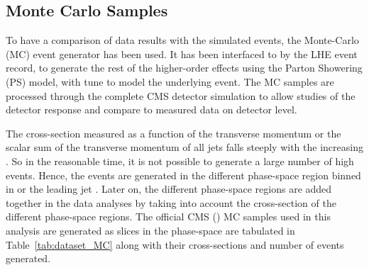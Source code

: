 \subsection{Monte Carlo Samples}
To have a comparison of data results with the simulated events, the \MadGraphF Monte-Carlo (MC) event generator has been used. It has been interfaced to \PYTHIAS by the LHE event record, to generate the rest of the higher-order effects using the Parton Showering (PS) model, with tune \Ztwostar to model the underlying event. The MC samples are processed through the complete CMS detector simulation to allow studies of the detector response and compare to measured data on detector level.

The cross-section measured as a function of the transverse momentum \pt or the scalar sum of the transverse momentum of all jets \HT falls steeply with the increasing \pt. So in the reasonable time, it is not possible to generate a large number of high \pt events. Hence, the events are generated in the different phase-space region binned in \HT or the leading jet \pt. Later on, the different phase-space regions are added together in the data analyses by taking into account the cross-section of the different phase-space regions. The official CMS \MadGraphFn\plusn \PYTHIAS (\MGP) MC samples used in this analysis are generated as slices in the \HT phase-space are tabulated in Table~\ref{tab:dataset_MC} along with their cross-sections and number of events generated.

